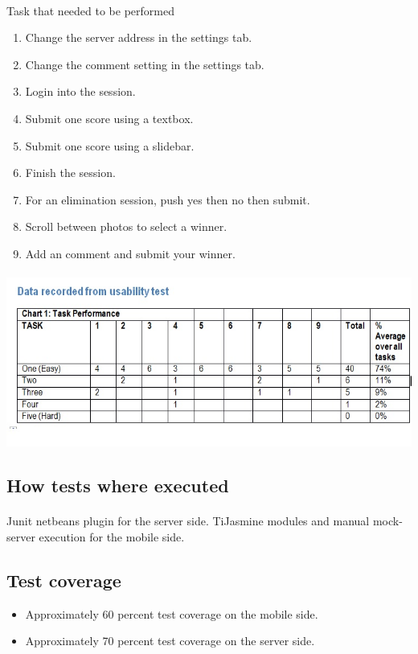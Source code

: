 \documentclass[10pt,a4paper]{article}
\begin{document}
\paragraph{} Task that needed to be performed
\begin{enumerate}
\item Change the server address in the settings tab.
\item Change the comment setting in the settings tab.
\item Login into the session.
\item Submit one score using a textbox.
\item Submit one score using a slidebar.
\item Finish the session.
\item For an elimination session, push yes then no then submit.
\item Scroll between photos to select a winner.
\item Add an comment and submit your winner.
\end{enumerate}
\paragraph{}
\includegraphics[scale=0.55]{Pictures/results.jpg}
\subsection{How tests where executed}
\paragraph{}
Junit netbeans plugin for the server side.
TiJasmine modules and manual mock-server execution for the mobile side.   
\subsection{Test coverage}
\begin{itemize}
\item Approximately 60 percent test coverage on the mobile side.
\item Approximately 70 percent test coverage on the server side. 
\end{itemize}
\end{document}
